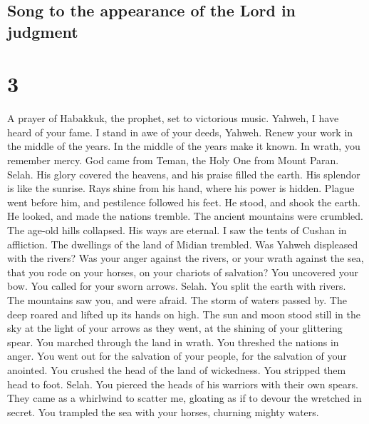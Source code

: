 \hypertarget{song-to-the-appearance-of-the-lord-in-judgment}{%
\subsection{Song to the appearance of the Lord in
judgment}\label{song-to-the-appearance-of-the-lord-in-judgment}}

\hypertarget{section-2}{%
\section{3}\label{section-2}}

 A prayer of Habakkuk, the prophet, set to victorious
music.  Yahweh, I have heard of your fame. I stand in awe
of your deeds, Yahweh. Renew your work in the middle of the years. In
the middle of the years make it known. In wrath, you remember mercy.
 God came from Teman, the Holy One from Mount Paran.
Selah. His glory covered the heavens, and his praise filled the earth.
 His splendor is like the sunrise. Rays shine from his
hand, where his power is hidden.  Plague went before him,
and pestilence followed his feet.  He stood, and shook the
earth. He looked, and made the nations tremble. The ancient mountains
were crumbled. The age-old hills collapsed. His ways are eternal.
 I saw the tents of Cushan in affliction. The dwellings of
the land of Midian trembled.  Was Yahweh displeased with
the rivers? Was your anger against the rivers, or your wrath against the
sea, that you rode on your horses, on your chariots of salvation?
 You uncovered your bow. You called for your sworn arrows.
Selah. You split the earth with rivers.  The mountains
saw you, and were afraid. The storm of waters passed by. The deep roared
and lifted up its hands on high.  The sun and moon stood
still in the sky at the light of your arrows as they went, at the
shining of your glittering spear.  You marched through
the land in wrath. You threshed the nations in anger. 
You went out for the salvation of your people, for the salvation of your
anointed. You crushed the head of the land of wickedness. You stripped
them head to foot. Selah.  You pierced the heads of his
warriors with their own spears. They came as a whirlwind to scatter me,
gloating as if to devour the wretched in secret.  You
trampled the sea with your horses, churning mighty waters.

